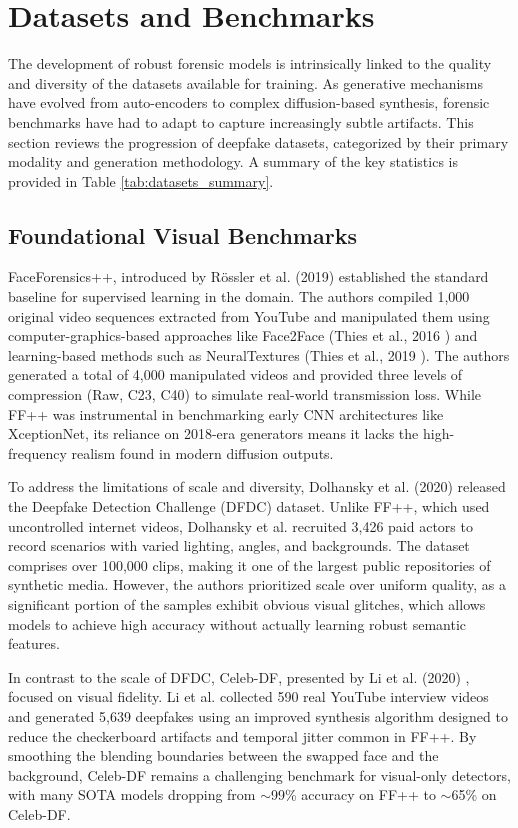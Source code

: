 \documentclass[12pt,a4paper]{report}
\begin{document}
\section{Datasets and Benchmarks}
The development of robust forensic models is intrinsically linked to the quality and diversity of the datasets available for training. As generative mechanisms have evolved from auto-encoders to complex diffusion-based synthesis, forensic benchmarks have had to adapt to capture increasingly subtle artifacts. This section reviews the progression of deepfake datasets, categorized by their primary modality and generation methodology. A summary of the key statistics is provided in Table \ref{tab:datasets_summary}.

\subsection{Foundational Visual Benchmarks}
FaceForensics++, introduced by Rössler et al. (2019) \cite{rossler2019faceforensics++} established the standard baseline for supervised learning in the domain. The authors compiled 1,000 original video sequences extracted from YouTube and manipulated them using computer-graphics-based approaches like Face2Face (Thies et al., 2016 \cite{thies2016face2face}) and learning-based methods such as NeuralTextures (Thies et al., 2019 \cite{thies2019deferred}). The authors generated a total of 4,000 manipulated videos and provided three levels of compression (Raw, C23, C40) to simulate real-world transmission loss. While FF++ was instrumental in benchmarking early CNN architectures like XceptionNet, its reliance on 2018-era generators means it lacks the high-frequency realism found in modern diffusion outputs.


To address the limitations of scale and diversity, Dolhansky et al. (2020) \cite{dolhansky2020deepfake} released the Deepfake Detection Challenge (DFDC) dataset. Unlike FF++, which used uncontrolled internet videos, Dolhansky et al. recruited 3,426 paid actors to record scenarios with varied lighting, angles, and backgrounds. The dataset comprises over 100,000 clips, making it one of the largest public repositories of synthetic media. However, the authors prioritized scale over uniform quality, as a significant portion of the samples exhibit obvious visual glitches, which allows models to achieve high accuracy without actually learning robust semantic features.

\pagebreak

In contrast to the scale of DFDC, Celeb-DF, presented by Li et al. (2020) \cite{li2020celeb}, focused on visual fidelity. Li et al. collected 590 real YouTube interview videos and generated 5,639 deepfakes using an improved synthesis algorithm designed to reduce the checkerboard artifacts and temporal jitter common in FF++. By smoothing the blending boundaries between the swapped face and the background, Celeb-DF remains a challenging benchmark for visual-only detectors, with many SOTA models dropping from $\sim$99\% accuracy on FF++ to $\sim$65\% on Celeb-DF.
\end{document}
